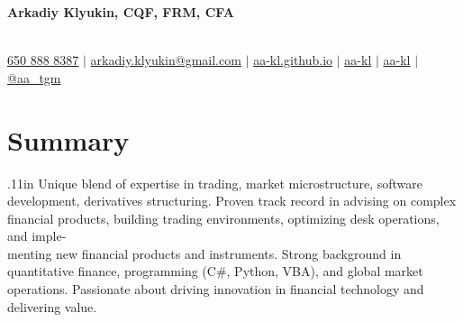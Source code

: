 \documentclass[letterpaper,hidelinks]{article}
\begin{document}


\begin{center}
  \hspace{-0.4cm}
  \textbf{\Huge{Arkadiy Klyukin, CQF, FRM, CFA}\\} \\ \vspace{1pt}
 
  \small
  \faMobile* \hspace{.5pt} \href{tel:+16508888387}{650 888 8387}
  $|$
  \faAt \hspace{.5pt} \href{mailto:arkadiy.klyukin@gmail.com}{arkadiy.klyukin@gmail.com}
  $|$
  \faGlobeAmericas \hspace{.5pt} \href{https://aa-kl.github.io}{aa-kl.github.io}
  $|$
  \faGithub \hspace{.5pt} \href{https://github.com/aa-kl}{aa-kl}
  $|$
  \faLinkedinIn \hspace{.5pt} \href{https://www.linkedin.com/in/aa-kl}{aa-kl}
  $|$
  \faTelegramPlane \hspace{.5pt} \href{https://t.me/aa_tgm}{@aa\_tgm}
\end{center}



\vspace{-27pt}
\section{Summary}
{\hspace{0.1in}
\raggedright{\leftskip.11in Unique blend of expertise in trading, market microstructure, software development, derivatives structuring. Proven track record in advising on complex financial products, building trading environments, optimizing desk operations, and imple-\\menting new financial products and instruments. Strong background in quantitative finance, programming (C\#, Python, VBA), and global market operations. Passionate about driving innovation in financial technology and delivering value.
\\}
}
\vspace{-6pt}
\end{document}
